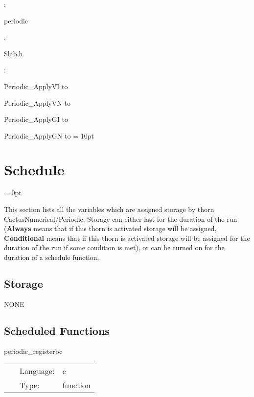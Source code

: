 : 

periodic
\vspace{2mm}

\vspace{5mm}

: 

Slab.h
\vspace{2mm}

: 



Periodic\_ApplyVI to 

Periodic\_ApplyVN to 

Periodic\_ApplyGI to 

Periodic\_ApplyGN to 
\vspace{2mm}\parskip = 10pt 

\section{Schedule} 


\parskip = 0pt


\noindent This section lists all the variables which are assigned storage by thorn CactusNumerical/Periodic.  Storage can either last for the duration of the run ({\bf Always} means that if this thorn is activated storage will be assigned, {\bf Conditional} means that if this thorn is activated storage will be assigned for the duration of the run if some condition is met), or can be turned on for the duration of a schedule function.


\subsection*{Storage}NONE
\subsection*{Scheduled Functions}
\vspace{5mm}


\hspace{5mm} periodic\_registerbc 

\hspace{5mm}{\it register periodic boundary conditions } 


\hspace{5mm}

 \begin{tabular*}{160mm}{cll} 
~ & Language:  & c \\ 
~ & Type:  & function \\ 
\end{tabular*} 


